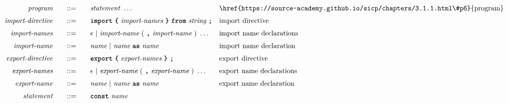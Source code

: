 \begin{alignat*}{9}
&& \textit{program}    &&\quad ::= &\quad && \textit{statement} \ \ldots
                                                           && \textrm{\href{https://source-academy.github.io/sicp/chapters/3.1.1.html\#p6}{program}} \\[1mm]
                                                           && \textit{import-directive}    &&\quad ::= &\quad && \textbf{\texttt{import}}\ \textbf{\texttt{\{}}\ \textit{import-names} \ \textbf{\texttt{\}}}\ \textbf{\texttt{from}}\  \textit{string} \ \textbf{\texttt{;}}
                                                           && \textrm{import directive} \\[1mm]
&& \textit{import-names}  && ::= &\quad && \epsilon\ | \ \textit{import-name}\ (
                                                               \ \textbf{\texttt{,}} \
                                                                 \textit{import-name} \ 
                                                                      )\ \ldots
                                                            && \textrm{import name declarations} \\[1mm]
&& \textit{import-name}  && ::= &\quad && \textit{name}\ | \ \textit{name}\ \textbf{\texttt{as}}\ \textit{name}
                                                            && \textrm{import name declaration} \\[1mm]
&& \textit{export-directive}    &&\quad ::= &\quad && \textbf{\texttt{export}}\ \textbf{\texttt{\{}}\ \textit{export-names} \ \textbf{\texttt{\}}}\ \textbf{\texttt{;}}
                                                           && \textrm{export directive} \\[1mm]
&& \textit{export-names}  && ::= &\quad && \epsilon\ | \ \textit{export-name}\ (
                                                               \ \textbf{\texttt{,}} \
                                                                 \textit{export-name} \ 
                                                                      )\ \ldots
                                                            && \textrm{export name declarations} \\[1mm]
&& \textit{export-name}  && ::= &\quad && \textit{name}\ | \ \textit{name}\ \textbf{\texttt{as}}\ \textit{name}
                                                            && \textrm{export name declaration} \\[1mm]
&& \textit{statement}    &&\quad ::= &\quad && \textbf{\texttt{const}}\  \textit{name} \ 

\end{alignat*}
